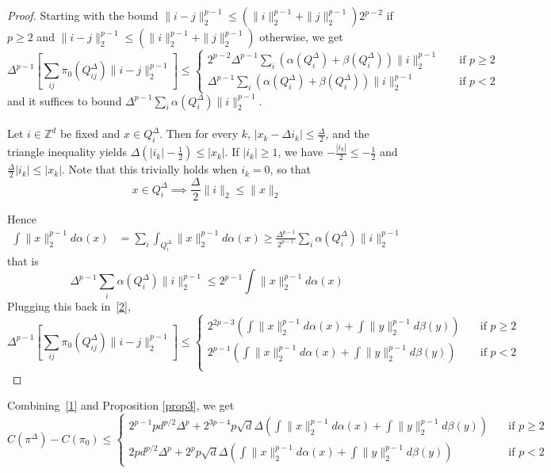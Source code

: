 \documentclass[12pt]{report}
\theoremstyle{definition}
\theoremstyle{remark}
\begin{document}
\begin{proof}
	Starting with the bound $\|i-j\|_2^{p-1}\leq  (\|i\|_2^{p-1}+\|j\|_2^{p-1})2^{p-2}$ if $p\geq 2$ and $\|i-j\|_2^{p-1}\leq  (\|i\|_2^{p-1}+\|j\|_2^{p-1})$ otherwise,
we get 
\begin{equation*}\Delta^{p-1} \left[\sum_{ij} \pi_0(Q_{ij}^{\Delta}) \|i-j\|_2^{p-1} \right]\leq 
\begin{cases}
2^{p-2}\Delta^{p-1}\sum_{i} \left(\alpha(Q_i^\Delta)+\beta(Q_i^\Delta)\right)\|i\|_2^{p-1} \quad &\text{if } p\geq 2\\
\Delta^{p-1}\sum_{i} \left(\alpha(Q_i^\Delta)+\beta(Q_i^\Delta)\right)\|i\|_2^{p-1} \quad &\text{if } p< 2
\end{cases}
\tag{2} \label{2}
\end{equation*}
and it suffices to bound $\Delta^{p-1} \sum_{i} \alpha(Q_i^\Delta)\|i\|_2^{p-1}$.\\
\\
Let $i\in \mathbb Z^d$ be fixed and $x\in Q_i^\Delta$. Then for every $k$, $|x_k-\Delta i_k|\leq \frac \Delta2$, and the triangle inequality yields $\Delta\left(|i_k|-\frac 12\right)\leq |x_k|$. If $|i_k|\geq 1$, we have $-\frac{|i_k|}{2}\leq -\frac 12$ and $\frac{\Delta}{2} |i_k|\leq |x_k|$. Note that this trivially holds when $i_k=0$, so that $$x\in Q_i^\Delta \implies \frac \Delta 2 \|i\|_2 \leq \|x\|_2$$

\noindent Hence 
$$\begin{aligned}
\int \|x\|_2^{p-1}d\alpha(x) &= \sum_i \int_{Q_i^\Delta} \|x\|_2^{p-1}d\alpha(x) 
\geq \frac{\Delta^{p-1}}{2^{p-1}}\sum_{i} \alpha(Q_i^\Delta) \|i\|_2^{p-1}
\end{aligned}$$
that is 
$$
\Delta^{p-1}\sum_{i} \alpha(Q_i^\Delta) \|i\|_2^{p-1} \leq 2^{p-1} \int \|x\|_2^{p-1}d\alpha(x)
$$
Plugging this back in~\eqref{2}, 
$$\Delta^{p-1} \left[\sum_{ij} \pi_0(Q_{ij}^{\Delta}) \|i-j\|_2^{p-1} \right]\leq
\begin{cases}
2^{2p-3} \left(\int \|x\|_2^{p-1}d\alpha(x)+ \int \|y\|_2^{p-1}d\beta(y)\right) \quad &\text{if } p\geq 2 \\
2^{p-1} \left(\int \|x\|_2^{p-1}d\alpha(x)+ \int \|y\|_2^{p-1}d\beta(y)\right) \quad &\text{if } p< 2 \\
\end{cases}
$$
\end{proof}

Combining~\eqref{1} and Proposition \ref{prop3}, we get
\begin{equation*}
C(\pi^{\Delta})-C(\pi_{0})\leq 
\begin{cases}
2^{p-1}pd^{p/2}\Delta^p + 2^{3p-4}p \sqrt d \Delta \left(\int \|x\|_2^{p-1}d\alpha(x)+ \int \|y\|_2^{p-1}d\beta(y)\right) \quad &\text{if } p\geq 2 \\
2pd^{p/2}\Delta^p + 2^{p}p \sqrt d \Delta \left(\int \|x\|_2^{p-1}d\alpha(x)+ \int \|y\|_2^{p-1}d\beta(y)\right) \quad &\text{if } p< 2 \tag{3} \label{3}
\end{cases}
\end{equation*}
\newpage
\end{document}
